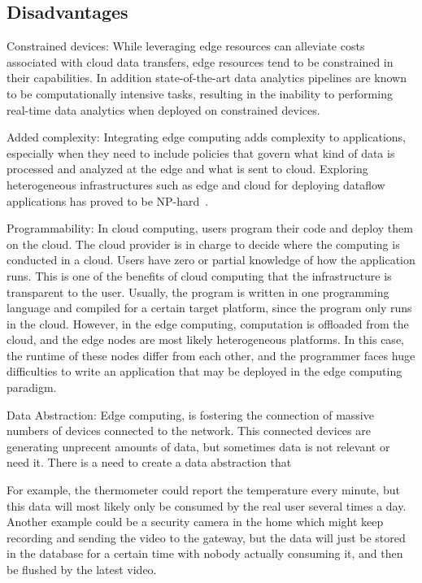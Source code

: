\subsection{Disadvantages}
Constrained devices: While leveraging edge resources can alleviate costs associated with cloud data transfers, edge resources tend to be constrained in their capabilities. In addition state-of-the-art data analytics pipelines are known to be computationally intensive tasks, resulting in the inability to performing real-time data analytics when deployed on constrained devices.

Added complexity: Integrating edge computing adds complexity to applications, especially when they need to include policies that govern what kind of data is processed and analyzed at the edge and what is sent to cloud. Exploring heterogeneous infrastructures such as edge and cloud for deploying dataflow applications has proved to be NP-hard~\cite{Benoit:2013}.

Programmability: In cloud computing, users program their code and deploy them on the cloud. The cloud provider is in charge to decide where the computing is conducted in a cloud. Users have zero or partial knowledge of how the application runs. This is one of the benefits of cloud computing that the infrastructure is transparent to the user. Usually, the program is written in one programming language and compiled for a certain target platform, since the program only runs in the cloud. However, in the edge computing, computation is offloaded from the cloud, and the edge nodes are most likely heterogeneous platforms. In this case, the runtime of these nodes differ from each other, and the programmer faces huge difficulties to write an application that may be deployed in the edge computing paradigm.

Data Abstraction: Edge computing, is fostering the connection of massive numbers of devices connected to the network. This connected devices are generating unprecent amounts of data, but sometimes data is not relevant or need it. There is a need to create a data abstraction that 

For example, the thermometer could report the temperature every minute, but this data will most likely only be consumed by the real user several times a day. Another example could be a security camera in the home which might keep recording and sending the video to the gateway, but the data will just be stored in the database for a certain time with nobody actually consuming it, and then be flushed by the latest video.

